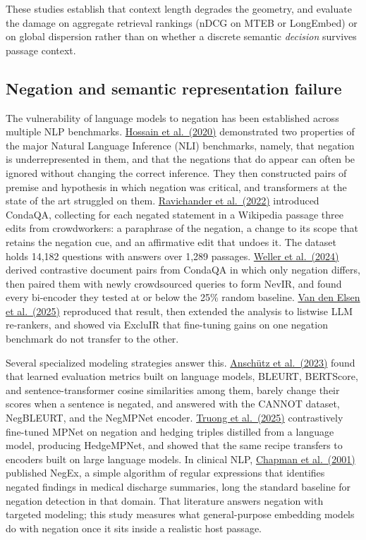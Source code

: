 \documentclass[11pt]{article}
\begin{document}
These studies establish that context length degrades the geometry, and evaluate the damage on aggregate retrieval rankings (nDCG on MTEB or LongEmbed) or on global dispersion rather than on whether a discrete semantic \emph{decision} survives passage context.

\subsection{Negation and semantic representation failure}

The vulnerability of language models to negation has been established across multiple NLP benchmarks. \hyperlink{bib:hossain}{Hossain et al.\ (2020)} demonstrated two properties of the major Natural Language Inference (NLI) benchmarks, namely, that negation is underrepresented in them, and that the negations that do appear can often be ignored without changing the correct inference. They then constructed pairs of premise and hypothesis in which negation was critical, and transformers at the state of the art struggled on them. \hyperlink{bib:ravichander}{Ravichander et al.\ (2022)} introduced CondaQA, collecting for each negated statement in a Wikipedia passage three edits from crowdworkers: a paraphrase of the negation, a change to its scope that retains the negation cue, and an affirmative edit that undoes it. The dataset holds 14,182 questions with answers over 1,289 passages. \hyperlink{bib:weller}{Weller et al.\ (2024)} derived contrastive document pairs from CondaQA in which only negation differs, then paired them with newly crowdsourced queries to form NevIR, and found every bi-encoder they tested at or below the 25\% random baseline. \hyperlink{bib:vandenelsen}{Van den Elsen et al.\ (2025)} reproduced that result, then extended the analysis to listwise LLM re-rankers, and showed via ExcluIR that fine-tuning gains on one negation benchmark do not transfer to the other.

Several specialized modeling strategies answer this. \hyperlink{bib:anschutz}{Ansch\"utz et al.\ (2023)} found that learned evaluation metrics built on language models, BLEURT, BERTScore, and sentence-transformer cosine similarities among them, barely change their scores when a sentence is negated, and answered with the CANNOT dataset, NegBLEURT, and the NegMPNet encoder. \hyperlink{bib:truong}{Truong et al.\ (2025)} contrastively fine-tuned MPNet on negation and hedging triples distilled from a language model, producing HedgeMPNet, and showed that the same recipe transfers to encoders built on large language models. In clinical NLP, \hyperlink{bib:chapman}{Chapman et al.\ (2001)} published NegEx, a simple algorithm of regular expressions that identifies negated findings in medical discharge summaries, long the standard baseline for negation detection in that domain. That literature answers negation with targeted modeling; this study measures what general-purpose embedding models do with negation once it sits inside a realistic host passage.
\end{document}
